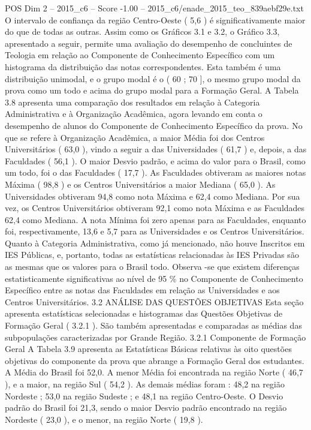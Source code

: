 \begin{textsample}{POS Dim 2 – 2015\_c6 – Score -1.00 – 2015\_c6/enade\_2015\_teo\_839aebf29e.txt}
O intervalo de confiança da região Centro-Oeste ( 5,6 ) é significativamente maior do que de todas as outras.
Assim como os Gráficos 3.1 e 3.2, o Gráfico 3.3, apresentado a seguir, permite uma avaliação do desempenho de concluintes de Teologia em relação ao Componente de Conhecimento Específico com um histograma da distribuição das notas correspondentes.
Esta também é uma distribuição unimodal, e o grupo modal é o ( 60 ; 70 ], o mesmo grupo modal da prova como um todo e acima do grupo modal para a Formação Geral.
A Tabela 3.8 apresenta uma comparação dos resultados em relação à Categoria Administrativa e à Organização Acadêmica, agora levando em conta o desempenho de alunos do Componente de Conhecimento Específico da prova.
No que se refere à Organização Acadêmica, a maior Média foi dos Centros Universitários ( 63,0 ), vindo a seguir a das Universidades ( 61,7 ) e, depois, a das Faculdades ( 56,1 ).
O maior Desvio padrão, e acima do valor para o Brasil, como um todo, foi o das Faculdades ( 17,7 ).
As Faculdades obtiveram as maiores notas Máxima ( 98,8 ) e os Centros Universitários a maior Mediana ( 65,0 ).
As Universidades obtiveram 94,8 como nota Máxima e 62,4 como Mediana.
Por sua vez, os Centros Universitários obtiveram 92,1 como nota Máxima e as Faculdades 62,4 como Mediana.
A nota Mínima foi zero apenas para as Faculdades, enquanto foi, respectivamente, 13,6 e 5,7 para as Universidades e os Centros Universitários.
Quanto à Categoria Administrativa, como já mencionado, não houve Inscritos em IES Públicas, e, portanto, todas as estatísticas relacionadas às IES Privadas são as mesmas que os valores para o Brasil todo.
Observa -se que existem diferenças estatisticamente significativas ao nível de 95 \% no Componente de Conhecimento Específico entre as notas das Faculdades em relação as Universidades e aos Centros Universitários. 3.2 ANÁLISE DAS QUESTÕES OBJETIVAS Esta seção apresenta estatísticas selecionadas e histogramas das Questões Objetivas de Formação Geral ( 3.2.1 ).
São também apresentadas e comparadas as médias das subpopulações caracterizadas por Grande Região. 3.2.1 Componente de Formação Geral A Tabela 3.9 apresenta as Estatísticas Básicas relativas às oito questões objetivas do componente da prova que abrange a Formação Geral dos estudantes.
A Média do Brasil foi 52,0.
A menor Média foi encontrada na região Norte ( 46,7 ), e a maior, na região Sul ( 54,2 ).
As demais médias foram : 48,2 na região Nordeste ; 53,0 na região Sudeste ; e 48,1 na região Centro-Oeste.
O Desvio padrão do Brasil foi 21,3, sendo o maior Desvio padrão encontrado na região Nordeste ( 23,0 ), e o menor, na região Norte ( 19,8 ).

\end{textsample}

